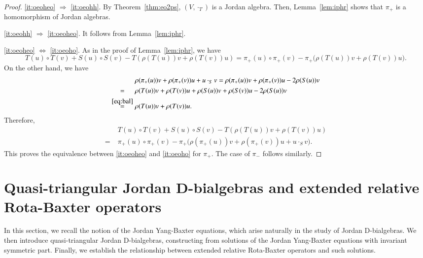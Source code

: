 \documentclass[12pt, reqno, a4paper]{amsart}
\theoremstyle{definition}
\begin{document}
\begin{proof}
	\ref{it:oeoheo} $\Longrightarrow$ \ref{it:oeohh}.
	By Theorem~\ref{thm:eo2ps}, $(V, \cdot_{T})$ is a Jordan algebra.
	Then, Lemma~\ref{lem:iphr} shows that $\pi_{+}$ is a homomorphism of Jordan algebras.

	\ref{it:oeohh} $\Longrightarrow$ \ref{it:oeoheo}.
	It follows from Lemma~\ref{lem:iphr}.

	\ref{it:oeoheo} $\Longleftrightarrow$ \ref{it:oeoho}.
	As in the proof of Lemma~\ref{lem:iphr}, we have
	\begin{equation*}
		T(u) \circ T(v) + S(u) \circ S(v) - T(\rho(T(u))v + \rho(T(v))u) = \pi_{+}(u) \circ \pi_{+}(v) - \pi_{+}\big( \rho(T(u))v + \rho(T(v))u \big).
	\end{equation*}
	On the other hand, we have
	\begin{align*}
		 & \rho(\pi_{+}(u))v + \rho(\pi_{+}(v))u + u \cdot_{S} v =\rho(\pi_{+}(u))v + \rho(\pi_{+}(v))u - 2 \rho(S(u))v \\
		 \overset{\hphantom{\eqref{eq:bal}}}{=}\; & \rho(T(u))v + \rho(T(v))u + \rho(S(u))v + \rho(S(v))u - 2 \rho(S(u))v  \\
		 \overset{\eqref{eq:bal}}{=}\; & \rho(T(u))v + \rho(T(v))u.
	\end{align*}
	Therefore,
	\begin{align*}
		&T(u) \circ T(v) + S(u) \circ S(v) - T(\rho(T(u))v + \rho(T(v))u) \\
		=\; & \pi_{+}(u) \circ \pi_{+}(v) - \pi_{+}\big( \rho(\pi_{+}(u))v + \rho(\pi_{+}(v))u + u \cdot_{S} v \big).
	\end{align*}
	This proves the equivalence between  \ref{it:oeoheo}  and  \ref{it:oeoho}  for $\pi_{+}$.
	The case of $\pi_{-}$ follows similarly.
\end{proof}




\section{Quasi-triangular Jordan D-bialgebras and extended relative Rota-Baxter operators}\label{sec:JYBE}

In this section, we recall the notion of the Jordan Yang-Baxter equations, which arise naturally in the study of Jordan D-bialgebras.
We then introduce quasi-triangular Jordan D-bialgebras, constructing from solutions of the Jordan Yang-Baxter equations with invariant symmetric part.
Finally, we establish the relationship between extended relative Rota-Baxter operators and such solutions.
\end{document}
